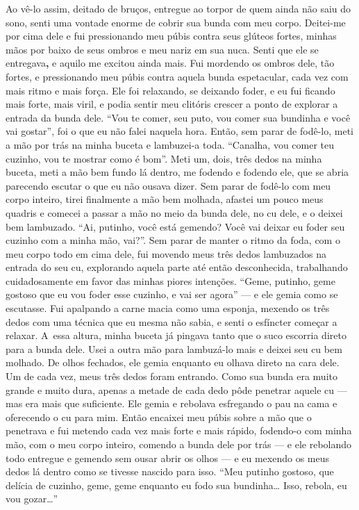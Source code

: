 Ao vê-lo assim, deitado de bruços, entregue ao torpor de quem ainda não
saiu do sono, senti uma vontade enorme de cobrir sua bunda com meu
corpo. Deitei-me por cima dele e fui pressionando meu púbis contra seus
glúteos fortes, minhas mãos por baixo de seus ombros e meu nariz em sua
nuca. Senti que ele se entregava\textbf{,} e aquilo me excitou ainda
mais. Fui mordendo os ombros dele, tão fortes, e pressionando meu púbis
contra aquela bunda espetacular, cada vez com mais ritmo e mais força.
Ele foi relaxando, se deixando foder, e eu fui ficando mais forte, mais
viril, e podia sentir meu clitóris crescer a ponto de explorar a entrada
da bunda dele. ``Vou te comer, seu puto, vou comer sua bundinha e você
vai gostar'', foi o que eu não falei naquela hora. Então, sem parar de
fodê-lo, meti a mão por trás na minha buceta e lambuzei-a toda.
``Canalha, vou comer teu cuzinho, vou te mostrar como é bom''. Meti um,
dois, três dedos na minha buceta, meti a mão bem fundo lá dentro, me
fodendo e fodendo ele, que se abria parecendo escutar o que eu não
ousava dizer. Sem parar de fodê-lo com meu corpo inteiro, tirei
finalmente a mão bem molhada, afastei um pouco meus quadris e comecei a
passar a mão no meio da bunda dele, no cu dele, e o deixei bem
lambuzado. ``Ai, putinho, você está gemendo? Você vai deixar eu foder
seu cuzinho com a minha mão, vai?''. Sem parar de manter o ritmo da
foda, com o meu corpo todo em cima dele, fui movendo meus três dedos
lambuzados na entrada do seu cu, explorando aquela parte até então
desconhecida, trabalhando cuidadosamente em favor das minhas piores
intenções. ``Geme, putinho, geme gostoso que eu vou foder esse cuzinho,
e vai ser agora'' --- e ele gemia como se escutasse. Fui apalpando a
carne macia como uma esponja, mexendo os três dedos com uma técnica que
eu mesma não sabia, e senti o esfíncter começar a relaxar. A~essa
altura, minha buceta já pingava tanto que o suco escorria direto para a
bunda dele. Usei a outra mão para lambuzá-lo mais e deixei seu cu bem
molhado. De olhos fechados, ele gemia enquanto eu olhava direto na cara
dele. Um de cada vez, meus três dedos foram entrando. Como sua bunda era
muito grande e muito dura, apenas a metade de cada dedo pôde penetrar
aquele cu --- mas era mais que suficiente. Ele gemia e rebolava
esfregando o pau na cama e oferecendo o cu para mim. Então encaixei meu
púbis sobre a mão que o penetrava e fui metendo cada vez mais forte e
mais rápido, fodendo-o com minha mão, com o meu corpo inteiro, comendo a
bunda dele por trás --- e ele rebolando todo entregue e gemendo sem
ousar abrir os olhos --- e eu mexendo os meus dedos lá dentro como se
tivesse nascido para isso. ``Meu putinho gostoso, que delícia de
cuzinho, geme, geme enquanto eu fodo sua bundinha… Isso, rebola,
eu vou gozar…''

